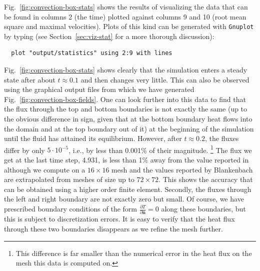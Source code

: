 \documentclass{article}
\begin{document}
Fig.~\ref{fig:convection-box-stats} shows the results of visualizing the data
that can be found in columns 2 (the time) plotted against columns 9 and 10
(root mean square and maximal velocities). Plots of this kind can be generated with
\texttt{Gnuplot} by typing (see Section~\ref{sec:viz-stat} for a more thorough
discussion):
\begin{verbatim}
  plot "output/statistics" using 2:9 with lines
\end{verbatim}
Fig.~\ref{fig:convection-box-stats} shows clearly that the simulation
enters a steady state after about $t\approx 0.1$ and then changes very little. This can also be observed using the
graphical output files from which we have generated
Fig.~\ref{fig:convection-box-fields}. One can look further into this data to
find that the flux through the top and bottom boundaries is not exactly the same
(up to the obvious difference in sign, given that at the bottom boundary heat
flows into the domain and at the top boundary out of it) at the beginning of the
simulation until the fluid has attained its equilibrium. However, after
$t\approx 0.2$, the fluxes differ by only $5\cdot 10^{-5}$, i.e., by less than
0.001\% of their magnitude.%
\footnote{This difference is far smaller than the numerical error in the heat
flux on the mesh this data is computed on.}
The flux we get at the last time step, 4.931, is less than 1\% away from the
value reported in \cite{BBC89} although we compute on a $16\times 16$ mesh and
the values reported by Blankenbach are extrapolated from meshes of size up to
$72\times 72$. This shows the accuracy that can be obtained using a higher order
finite element. Secondly, the fluxes through the left and right boundary are not
exactly zero but small. Of course, we have prescribed boundary conditions of the
form $\frac{\partial T}{\partial \mathbf n}=0$ along these boundaries, but this
is subject to discretization errors. It is easy to verify that the heat flux
through these two boundaries disappears as we refine the mesh further.
\end{document}
